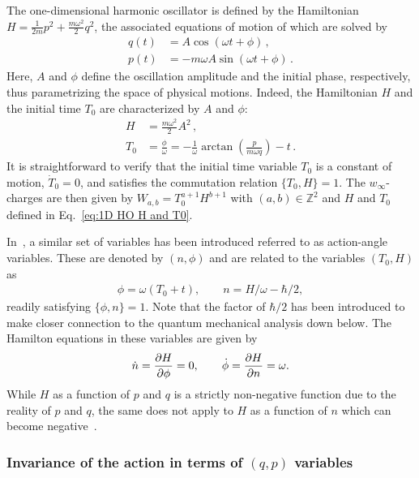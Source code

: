 \documentclass[onecolumn,notitlepage,superscriptaddress, nofootinbib,nobibnotes, aps,prd,10pt]{revtex4-1}%
\def\be{\begin{eqnarray}}
\def\ee{\end{eqnarray}}
\begin{document}
The one-dimensional harmonic oscillator is defined by the Hamiltonian $H = \frac{1}{2m}p^2+\frac{m\omega^2}{2}q^2$, the associated equations of motion of which are solved by
%
\begin{subequations}
\begin{align}
    q(t) &= A\cos(\omega t+\phi)\, ,\\[7pt]
    p(t) &= -m\omega A\sin(\omega t +\phi)\, .
\end{align}
\end{subequations}
%
Here, $A$ and $\phi$ define the oscillation amplitude and the initial phase, respectively, thus parametrizing the space of physical motions. Indeed, the Hamiltonian $H$ and the initial time $T_0$ are characterized by $A$ and $\phi$:
%
\begin{subequations}\label{eq:1D HO H and T0}
\begin{align}
    H &= \frac{m\omega^2}{2}A^2\, ,\\[7pt]
    T_0 &=\frac{ \phi}{\omega} = -\frac{1}{\omega}\arctan\left(\frac{p}{m\omega q}\right) -t\, .
\end{align}
\end{subequations}
%
It is straightforward to verify that the initial time variable $T_0$ is a constant of motion, $\dot{T}_0 = 0$, and satisfies the commutation relation $\{T_0,H\} = 1$. The $w_\infty$-charges are then given by $W_{a,b} = T_0^{a+1}H^{b+1}$ with $(a,b)\in\mathbb{Z}^2$ and $H$ and $T_0$ defined in Eq.~\eqref{eq:1D HO H and T0}.  

In~\cite{Augustin1979}, a similar set of variables has been introduced referred to as action-angle variables. These are denoted by $(n,\phi)$ and are related to the variables $(T_0, H)$ as
\be
\phi = \omega (T_0 + t),\qquad n = H/\omega - \hbar/2,
\ee
readily satisfying $\{\phi,n\} = 1$. Note that the factor of $\hbar / 2$ has been introduced to make closer connection to the quantum mechanical analysis down below. The Hamilton equations in these variables are given by
\be
\dot{n} = \pdv{H}{\phi} = 0,\qquad \dot{\phi} = \pdv{H}{n} = \omega.
\ee
While $H$ as a function of $p$ and $q$ is a strictly non-negative function due to the reality of $p$ and $q$, the same does not apply to $H$ as a function of $n$ which can become negative~\cite{Augustin1979}.  

\subsubsection{Invariance of the action in terms of $(q,p)$ variables }
\end{document}
